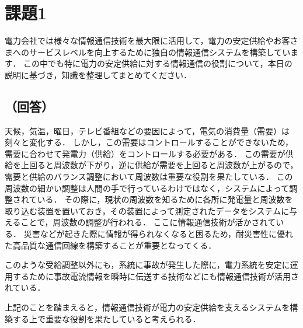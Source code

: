 \section*{課題1}
電力会社では様々な情報通信技術を最大限に活用して，電力の安定供給やお客さまへのサービスレベルを向上するために独自の情報通信システムを構築しています．
この中でも特に電力の安定供給に対する情報通信の役割について，本日の説明に基づき，知識を整理してまとめてください．

\subsection*{（回答）}
天候，気温，曜日，テレビ番組などの要因によって，電気の消費量（需要）は刻々と変化する．
しかし，この需要はコントロールすることができないため，需要に合わせて発電力（供給）をコントロールする必要がある．
この需要が供給を上回ると周波数が下がり，逆に供給が需要を上回ると周波数が上がるので，需要と供給のバランス調整において周波数は重要な役割を果たしている．
この周波数の細かい調整は人間の手で行っているわけではなく，システムによって調整されている．
その際に，現状の周波数を知るために各所に発電量と周波数を取り込む装置を置いておき，その装置によって測定されたデータをシステムに与えることで，周波数の調整が行われる．
ここに情報通信技術が活かされている．
災害などが起きた際に情報が得られなくなると困るため，耐災害性に優れた高品質な通信回線を構築することが重要となってくる．

このような受給調整以外にも，系統に事故が発生した際に，電力系統を安定に運用するために事故電流情報を瞬時に伝送する技術などにも情報通信技術が活用されている．

上記のことを踏まえると，情報通信技術が電力の安定供給を支えるシステムを構築する上で重要な役割を果たしていると考えられる．
